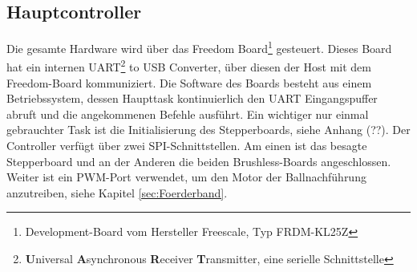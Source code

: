 		
    \subsection{Hauptcontroller}
        Die gesamte Hardware wird über das Freedom Board\footnote{Development-Board vom 
        Hersteller Freescale, Typ FRDM-KL25Z} gesteuert. Dieses Board hat ein internen UART\footnote{\textbf{U}niversal \textbf{A}synchronous \textbf{R}eceiver 
        \textbf{T}ransmitter, eine serielle Schnittstelle} to USB Converter, über diesen 
        der Host mit dem Freedom-Board kommuniziert. Die Software des Boards besteht aus einem 
        Betriebssystem, dessen Haupttask kontinuierlich den UART Eingangspuffer abruft 
        und die angekommenen Befehle ausführt. Ein wichtiger nur einmal gebrauchter Task 
        ist die Initialisierung des Stepperboards, siehe Anhang (??). Der Controller 
        verfügt über zwei SPI-Schnittstellen. Am einen ist das besagte Stepperboard und 
        an der Anderen die beiden Brushless-Boards angeschlossen. Weiter ist ein PWM-Port 
        verwendet, um den Motor der Ballnachführung anzutreiben, siehe Kapitel 
        \ref{sec:Foerderband}.  

   
